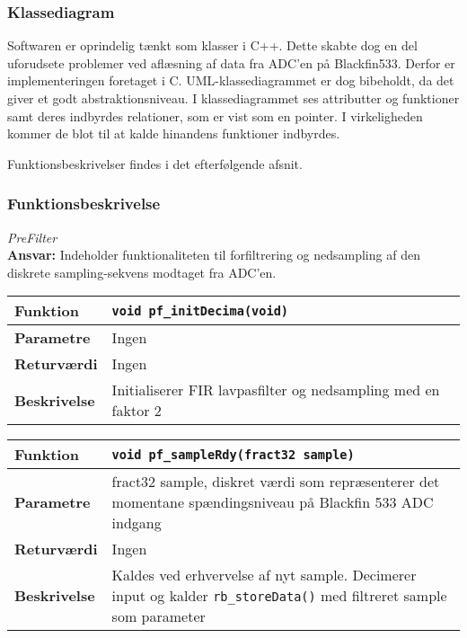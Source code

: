 \subsubsection*{Klassediagram}
Softwaren er oprindelig tænkt som klasser i C++. Dette skabte dog en del uforudsete problemer ved aflæsning af data fra ADC'en på Blackfin533. Derfor er implementeringen foretaget i C. UML-klassediagrammet er dog bibeholdt, da det giver et godt abstraktionsniveau. I klassediagrammet ses attributter og funktioner samt deres indbyrdes relationer, som er vist som en pointer. I virkeligheden kommer de blot til at kalde hinandens funktioner indbyrdes. 

Funktionsbeskrivelser findes i det efterfølgende afsnit. 

\subsubsection*{Funktionsbeskrivelse}

\textit{PreFilter} \\
\textbf{Ansvar:} Indeholder funktionaliteten til forfiltrering og nedsampling af den diskrete sampling-sekvens modtaget fra ADC'en.


\begin{center}
    \begin{tabular}{ | l | p{} |}
    \hline
    \textbf{Funktion}	& \verb+void pf_initDecima(void) +						\\ \hline
    \textbf{Parametre} 	& Ingen 											\\ \hline
    \textbf{Returværdi}	& Ingen																				\\ \hline
    \textbf{Beskrivelse}	& Initialiserer FIR lavpasfilter og nedsampling med en faktor 2		\\ \hline
    \end{tabular}
\end{center}

\begin{center}
    \begin{tabular}{ | l | p{} |}
    \hline
    \textbf{Funktion}	& \verb+void pf_sampleRdy(fract32 sample) +						\\ \hline
    \textbf{Parametre} 	& fract32 sample, diskret værdi som repræsenterer det momentane spændingsniveau på Blackfin 533 ADC indgang 	\\ \hline
    \textbf{Returværdi}	& Ingen 								\\ \hline
    \textbf{Beskrivelse}	& Kaldes ved erhvervelse af nyt sample. Decimerer input og kalder \verb+rb_storeData()+ med filtreret sample som parameter\\ \hline
    \end{tabular}
\end{center}

